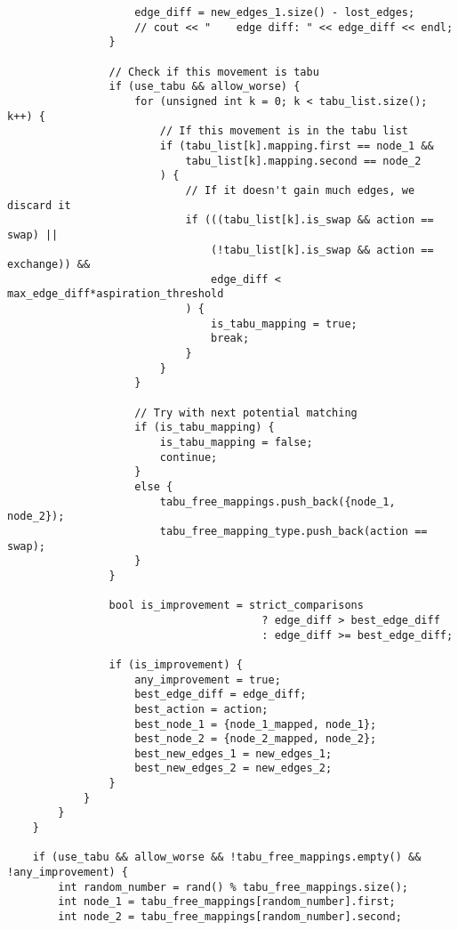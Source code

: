 \begin{lstlisting}
                    edge_diff = new_edges_1.size() - lost_edges;
                    // cout << "    edge diff: " << edge_diff << endl;
                }

                // Check if this movement is tabu
                if (use_tabu && allow_worse) {
                    for (unsigned int k = 0; k < tabu_list.size(); k++) {
                        // If this movement is in the tabu list
                        if (tabu_list[k].mapping.first == node_1 &&
                            tabu_list[k].mapping.second == node_2
                        ) {
                            // If it doesn't gain much edges, we discard it
                            if (((tabu_list[k].is_swap && action == swap) ||
                                (!tabu_list[k].is_swap && action == exchange)) &&
                                edge_diff < max_edge_diff*aspiration_threshold
                            ) {
                                is_tabu_mapping = true;
                                break;
                            }
                        }
                    }

                    // Try with next potential matching
                    if (is_tabu_mapping) {
                        is_tabu_mapping = false;
                        continue;
                    }
                    else {
                        tabu_free_mappings.push_back({node_1, node_2});
                        tabu_free_mapping_type.push_back(action == swap);
                    }
                }

                bool is_improvement = strict_comparisons
                                        ? edge_diff > best_edge_diff
                                        : edge_diff >= best_edge_diff;

                if (is_improvement) {
                    any_improvement = true;
                    best_edge_diff = edge_diff;
                    best_action = action;
                    best_node_1 = {node_1_mapped, node_1};
                    best_node_2 = {node_2_mapped, node_2};
                    best_new_edges_1 = new_edges_1;
                    best_new_edges_2 = new_edges_2;
                }
            }
        }
    }

    if (use_tabu && allow_worse && !tabu_free_mappings.empty() && !any_improvement) {
        int random_number = rand() % tabu_free_mappings.size();
        int node_1 = tabu_free_mappings[random_number].first;
        int node_2 = tabu_free_mappings[random_number].second;


\end{lstlisting}
